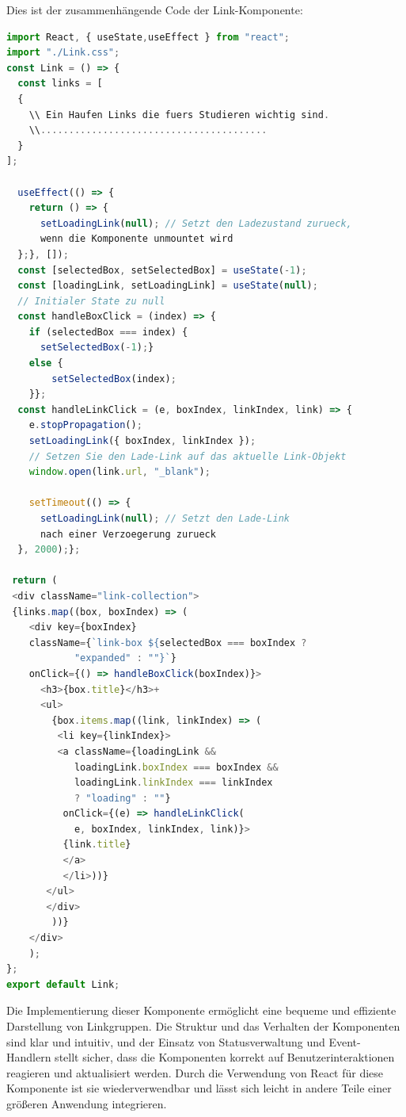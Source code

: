 Dies ist der zusammenhängende Code der Link-Komponente:
\begin{lstlisting}[language=JavaScript,
	frame=single,           % Ein Rahmen um den Code
	framexleftmargin=15pt,  % Rahmen link von den Zahlen
	style=algoBericht,
	label={Links-Komponente},
	captionpos=b ,          % Caption unter den Code setzen
	caption={Links-Komponente}]
import React, { useState,useEffect } from "react";
import "./Link.css";
const Link = () => {
  const links = [
  {
  	\\ Ein Haufen Links die fuers Studieren wichtig sind.
  	\\........................................
  }
];

  useEffect(() => {
    return () => {
      setLoadingLink(null); // Setzt den Ladezustand zurueck, 
      wenn die Komponente unmountet wird
  };}, []);
  const [selectedBox, setSelectedBox] = useState(-1);
  const [loadingLink, setLoadingLink] = useState(null); 
  // Initialer State zu null
  const handleBoxClick = (index) => {
    if (selectedBox === index) {
      setSelectedBox(-1);} 
    else {
    	setSelectedBox(index);
    }};
  const handleLinkClick = (e, boxIndex, linkIndex, link) => {
  	e.stopPropagation();
  	setLoadingLink({ boxIndex, linkIndex }); 
  	// Setzen Sie den Lade-Link auf das aktuelle Link-Objekt
  	window.open(link.url, "_blank");
	
    setTimeout(() => {
      setLoadingLink(null); // Setzt den Lade-Link 
      nach einer Verzoegerung zurueck
  }, 2000);};

 return (
 <div className="link-collection">
 {links.map((box, boxIndex) => (
 	<div key={boxIndex}
 	className={`link-box ${selectedBox === boxIndex ? 
 			"expanded" : ""}`}
 	onClick={() => handleBoxClick(boxIndex)}>
      <h3>{box.title}</h3>+
      <ul>
        {box.items.map((link, linkIndex) => (
         <li key={linkIndex}>
         <a className={loadingLink && 
         	loadingLink.boxIndex === boxIndex && 
         	loadingLink.linkIndex === linkIndex 
         	? "loading" : ""}
          onClick={(e) => handleLinkClick(
          	e, boxIndex, linkIndex, link)}>
          {link.title}
          </a>
          </li>))}
       </ul>
       </div>
		))}
	</div>
	);
};
export default Link;

\end{lstlisting}

Die Implementierung dieser Komponente ermöglicht eine bequeme und effiziente Darstellung von Linkgruppen. Die Struktur und das Verhalten der Komponenten sind klar und intuitiv, und der Einsatz von Statusverwaltung und Event-Handlern stellt sicher, dass die Komponenten korrekt auf Benutzerinteraktionen reagieren und  aktualisiert werden. Durch die Verwendung von React für diese Komponente ist sie wiederverwendbar und lässt sich leicht in andere Teile einer größeren Anwendung integrieren.
\newpage
